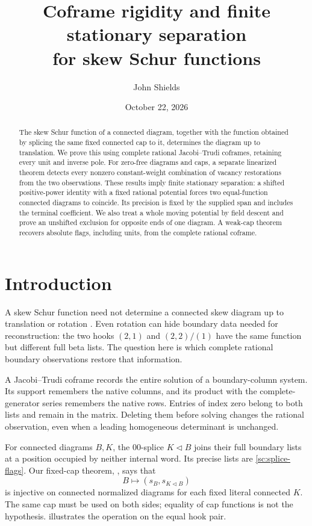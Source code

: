 \documentclass[11pt,a4paper]{amsart}
\title[Coframe rigidity and stationary separation]
{Coframe rigidity and finite stationary separation\\for skew Schur functions}
\author{John Shields}
\date{October 22, 2026}
\numberwithin{equation}{section}
\theoremstyle{plain}
\theoremstyle{definition}
\begin{document}
\begin{abstract}
The skew Schur function of a connected diagram, together with the function
obtained by splicing the same fixed connected cap to it, determines the
diagram up to translation.  We prove this using complete rational
Jacobi--Trudi coframes, retaining every unit and inverse pole.  For
zero-free diagrams and caps, a separate linearized theorem detects every
nonzero constant-weight combination of vacancy restorations from the two
observations.  These results imply finite stationary separation: a
shifted positive-power identity with a fixed rational potential forces
two equal-function connected diagrams to coincide.  Its precision is
fixed by the supplied span and includes the terminal coefficient.
We also treat a whole moving potential by field descent and prove an
unshifted exclusion for opposite ends of one diagram.  A weak-cap theorem
recovers absolute flags, including units, from the complete rational
coframe.
\end{abstract}
\maketitle

\section{Introduction}\label{sec:introduction}

A skew Schur function need not determine a connected skew diagram up to
translation or rotation \cite{Reiner2007Coincidences}.  Even rotation can
hide boundary data needed for reconstruction: the two hooks
\((2,1)\) and \((2,2)/(1)\) have the same function but different full beta
lists.  The question here is which complete rational boundary observations
restore that information.

A Jacobi--Trudi coframe records the entire solution of a boundary-column
system.  Its support remembers the native columns, and its product with
the complete-generator series remembers the native rows.  Entries of
index zero belong to both lists and remain in the matrix.  Deleting them
before solving changes the rational observation, even when a leading
homogeneous determinant is unchanged.

For connected diagrams \(B,K\), the \(00\)-splice
\(K\mathbin{\triangleleft}B\) joins their full boundary lists at a position
occupied by neither internal word.  Its precise lists are
\eqref{sc:splice-flags}.  Our fixed-cap theorem, , says
that
\[
 B\longmapsto (s_B,s_{K\triangleleft B})
\]
is injective on connected normalized diagrams for each fixed literal
connected \(K\).  The same cap must be used on both sides; equality of cap
functions is not the hypothesis.   illustrates the
operation on the equal hook pair.
\end{document}
